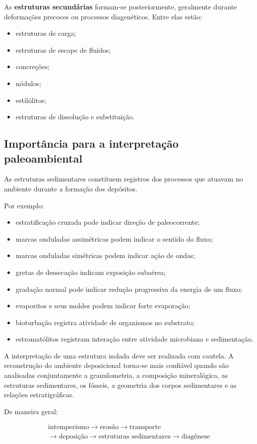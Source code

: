 As \textbf{estruturas secundárias} formam-se posteriormente, geralmente durante
deformações precoces ou processos diagenéticos. Entre elas estão:

\begin{itemize}
    \item estruturas de carga;
    \item estruturas de escape de fluidos;
    \item concreções;
    \item nódulos;
    \item estilólitos;
    \item estruturas de dissolução e substituição.
\end{itemize}

\subsection{Importância para a interpretação paleoambiental}

As estruturas sedimentares constituem registros dos processos que atuavam no
ambiente durante a formação dos depósitos.

Por exemplo:

\begin{itemize}
    \item estratificação cruzada pode indicar direção de paleocorrente;
    \item marcas onduladas assimétricas podem indicar o sentido do fluxo;
    \item marcas onduladas simétricas podem indicar ação de ondas;
    \item gretas de dessecação indicam exposição subaérea;
    \item gradação normal pode indicar redução progressiva da energia de um fluxo;
    \item evaporitos e seus moldes podem indicar forte evaporação;
    \item bioturbação registra atividade de organismos no substrato;
    \item estromatólitos registram interação entre atividade microbiana e sedimentação.
\end{itemize}

A interpretação de uma estrutura isolada deve ser realizada com cautela. A
reconstrução do ambiente deposicional torna-se mais confiável quando são
analisadas conjuntamente a granulometria, a composição mineralógica, as
estruturas sedimentares, os fósseis, a geometria dos corpos sedimentares e as
relações estratigráficas.

De maneira geral:

\[
\boxed{
\begin{gathered}
\text{intemperismo}
\rightarrow
\text{erosão}
\rightarrow
\text{transporte}
\\
\rightarrow
\text{deposição}
\rightarrow
\text{estruturas sedimentares}
\rightarrow
\text{diagênese}
\end{gathered}
}
\]


